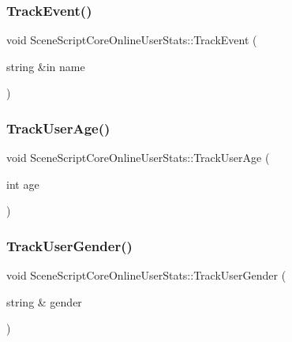 \hypertarget{class_scene_script_core_online_user_stats_a9bfaf9b00c4e45f671fedc2d1eb1e03e}{}\label{class_scene_script_core_online_user_stats_a9bfaf9b00c4e45f671fedc2d1eb1e03e} 
\subsubsection{\texorpdfstring{Track\+Event()}{TrackEvent()}}
{\footnotesize\ttfamily void Scene\+Script\+Core\+Online\+User\+Stats\+::\+Track\+Event (\begin{DoxyParamCaption}\item[{string \&in}]{name }\end{DoxyParamCaption})}

\hypertarget{class_scene_script_core_online_user_stats_a7f55a546a10f42100f39fb26ae665747}{}\label{class_scene_script_core_online_user_stats_a7f55a546a10f42100f39fb26ae665747} 
\subsubsection{\texorpdfstring{Track\+User\+Age()}{TrackUserAge()}}
{\footnotesize\ttfamily void Scene\+Script\+Core\+Online\+User\+Stats\+::\+Track\+User\+Age (\begin{DoxyParamCaption}\item[{int}]{age }\end{DoxyParamCaption})}

\hypertarget{class_scene_script_core_online_user_stats_ab4de92b0e8e5cd67d24eb0806467df21}{}\label{class_scene_script_core_online_user_stats_ab4de92b0e8e5cd67d24eb0806467df21} 
\subsubsection{\texorpdfstring{Track\+User\+Gender()}{TrackUserGender()}}
{\footnotesize\ttfamily void Scene\+Script\+Core\+Online\+User\+Stats\+::\+Track\+User\+Gender (\begin{DoxyParamCaption}\item[{string \&}]{gender }\end{DoxyParamCaption})}

